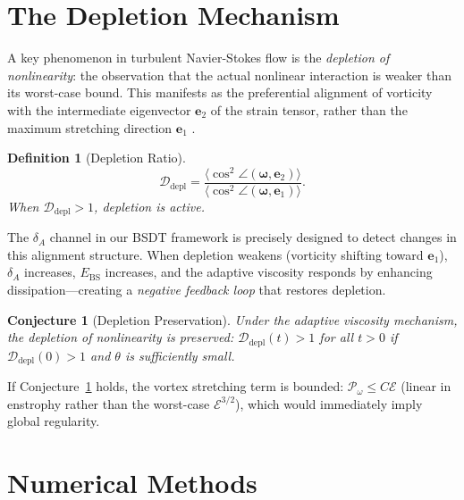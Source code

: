 \documentclass[12pt, a4paper]{article}
\newtheorem{conjecture}[theorem]{Conjecture}
\newtheorem{definition}[theorem]{Definition}
\newcommand{\Ebs}{E_{\mathrm{BS}}}
\begin{document}
\section{The Depletion Mechanism}\label{sec:depletion}

A key phenomenon in turbulent Navier-Stokes flow is the
\emph{depletion of nonlinearity}: the observation that the
actual nonlinear interaction is weaker than its worst-case bound.
This manifests as the preferential alignment of vorticity with the
intermediate eigenvector $\mathbf{e}_2$ of the strain tensor,
rather than the maximum stretching direction $\mathbf{e}_1$
\cite{ashurst1987,tsinober1992,buxton2010}.

\begin{definition}[Depletion Ratio]
\begin{equation}
\mathcal{D}_{\mathrm{depl}} = \frac{\langle \cos^2\angle(\boldsymbol{\omega}, \mathbf{e}_2)\rangle}
{\langle \cos^2\angle(\boldsymbol{\omega}, \mathbf{e}_1)\rangle}.
\end{equation}
When $\mathcal{D}_{\mathrm{depl}} > 1$, depletion is active.
\end{definition}

The $\delta_A$ channel in our BSDT framework is precisely designed
to detect changes in this alignment structure. When depletion weakens
(vorticity shifting toward $\mathbf{e}_1$), $\delta_A$ increases,
$\Ebs$ increases, and the adaptive viscosity responds by enhancing
dissipation---creating a \emph{negative feedback loop} that
restores depletion.

\begin{conjecture}[Depletion Preservation]\label{conj:depletion}
Under the adaptive viscosity mechanism, the depletion of nonlinearity
is preserved: $\mathcal{D}_{\mathrm{depl}}(t) > 1$ for all $t > 0$
if $\mathcal{D}_{\mathrm{depl}}(0) > 1$ and $\theta$ is sufficiently small.
\end{conjecture}

If Conjecture~\ref{conj:depletion} holds, the vortex stretching term
is bounded: $\mathcal{P}_\omega \leq C \mathcal{E}$ (linear in enstrophy
rather than the worst-case $\mathcal{E}^{3/2}$), which would
immediately imply global regularity.


\section{Numerical Methods}\label{sec:numerics}
\end{document}
